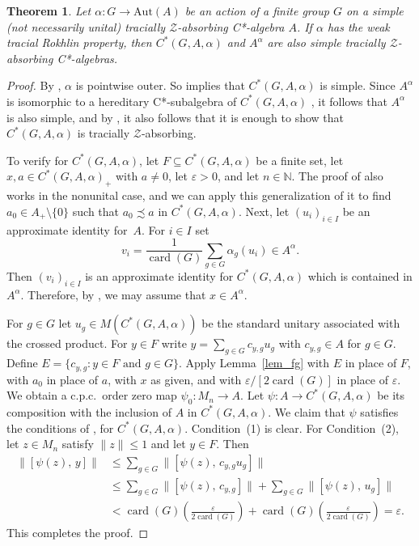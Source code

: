 \documentclass[11pt]{amsart}
\theoremstyle{plain}
\newtheorem{theorem}{Theorem}[section]
\theoremstyle{definition}
\theoremstyle{remark}
\numberwithin{equation}{section}
\newcommand{\ep}{\varepsilon}
\newcommand{\card}{{\operatorname{card}}}
\begin{document}
\begin{theorem}\label{thm_fg}
Let $\alpha \colon G \to \mathrm{Aut} (A)$ be an
action of a finite group $G$ on a simple (not necessarily unital)
tracially $\mathcal{Z}$-absorbing C*-algebra $A$.
If $\alpha$ has the weak tracial Rokhlin
property, then $C^{*} (G, A, \alpha)$ and $A^{\alpha}$ are also  simple
tracially $\mathcal{Z}$-absorbing C*-algebras.
\end{theorem}

\begin{proof}
By \cite[Proposition~3.2]{FG17},
$\alpha$ is pointwise outer.
So \cite[Theorem 3.1]{Ki81}
implies that $C^{*} (G, A, \alpha)$ is simple.
Since $A^{\alpha}$ is isomorphic
to a hereditary C*-subalgebra of $C^{*} (G, A, \alpha)$ \cite{Ro79},
it follows that $A^{\alpha}$ is also simple,
and by \cite[Theorem~4.1]{AGJP21}, it also follows that it is
enough to show that $C^{*} (G, A, \alpha)$ is
tracially $\mathcal{Z}$-absorbing.

To verify \cite[Definition~3.6]{AGJP21} for $C^{*} (G, A, \alpha)$,
let $F \subseteq C^{*} (G, A, \alpha)$ be a finite set,
let $x, a \in C^{*} (G, A, \alpha)_{+}$ with $a \neq0$,
let $\varepsilon > 0$, and let $n \in \mathbb{N}$.
The proof of \cite[Lemma~5.1]{HO13}
also works in the nonunital case,
and we can apply this generalization of it
to find $a_{0} \in A_{+} \setminus \{ 0 \}$
such that $a_{0} \precsim a$ in $C^{*} (G, A, \alpha)$.
Next,
let $(u_{i})_{i \in I}$ be an approximate identity for~$A$.
For $i \in I$ set
\[
v_{i}
 = \frac{1}{\card (G)} \sum_{g \in G} \alpha_{g} (u_{i})
 \in A^{\alpha}.
\]
Then $(v_{i})_{i \in I}$
is an approximate identity for $C^{*} (G, A, \alpha)$
which is contained in $A^{\alpha}$.
Therefore, by \cite[Remark~3.8]{AGJP21},
we may assume that $x \in A^{\alpha}$.

For $g \in G$ let $u_g \in M ( C^{*} (G, A, \alpha) )$
be the standard unitary
associated with the crossed product.
For $y \in F$ write
$y = \sum_{g \in G} c_{y, g} u_g$ with $c_{y, g} \in A$ for
$g \in G$.
Define
$E = \big\{ c_{y, g} \colon {\mbox{$y \in F$ and $g \in G$}} \big\}$.
Apply Lemma~\ref{lem_fg} with $E$ in place of $F$,
with $a_{0}$ in place of $a$, with $x$ as given,
and with $\varepsilon / [2 \card (G) ]$ in place of $\varepsilon$.
We obtain a c.p.c.~order zero map $\psi_0 \colon M_{n} \to A$.
Let $\psi \colon A \to C^{*} (G, A, \alpha)$ be its composition
with the inclusion of $A$ in $C^{*} (G, A, \alpha)$.
We claim that $\psi$ satisfies
the conditions of \cite[Definition~3.6]{AGJP21},
for $C^{*} (G, A, \alpha)$.
Condition~(1) is clear.
For Condition~(2),
let $z \in M_n$ satisfy $\| z \| \leq 1$ and let $y \in F$.
Then
%
\begin{align*}
\| [ \psi (z), \, y ] \|
& \leq \sum_{g \in G} \| [ \psi (z), \, c_{y, g} u_g ] \|
\\
& \leq \sum_{g \in G} \| [ \psi (z), \, c_{y, g} ] \|
      + \sum_{g \in G} \| [ \psi (z), \, u_g ] \|
\\
&  < \card (G) \left( \frac{\ep}{2 \card (G)} \right)
       + \card (G) \left( \frac{\ep}{2 \card (G)} \right)
   = \ep.
\end{align*}
%
This completes the proof.
\end{proof}
\end{document}
